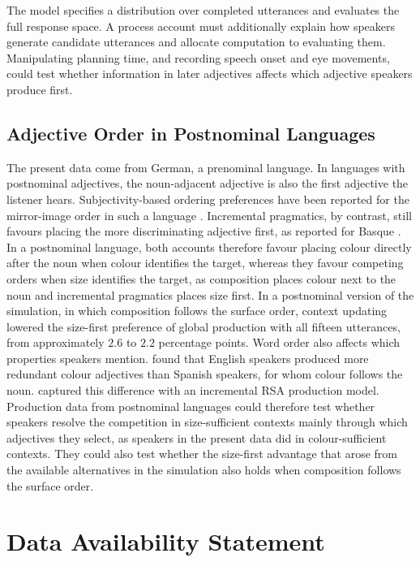 \documentclass[10pt,a4paper,fleqn]{article}
\begin{document}
The model specifies a distribution over completed utterances and evaluates the full response space.
A process account must additionally explain how speakers generate candidate utterances and allocate computation to evaluating them.
Manipulating planning time, and recording speech onset and eye movements, could test whether information in later adjectives affects which adjective speakers produce first.

\subsection{Adjective Order in Postnominal Languages}

The present data come from German, a prenominal language.
In languages with postnominal adjectives, the noun-adjacent adjective is also the first adjective the listener hears.
Subjectivity-based ordering preferences have been reported for the mirror-image order in such a language \citep{trainin2023subjectivity}.
Incremental pragmatics, by contrast, still favours placing the more discriminating adjective first, as reported for Basque \citep[p.~47]{fukumura2018ordering}.
In a postnominal language, both accounts therefore favour placing colour directly after the noun when colour identifies the target, whereas they favour competing orders when size identifies the target, as composition places colour next to the noun and incremental pragmatics places size first.
In a postnominal version of the simulation, in which composition follows the surface order, context updating lowered the size-first preference of global production with all fifteen utterances, from approximately $2.6$ to $2.2$ percentage points.
Word order also affects which properties speakers mention.
\citet{rubio2021wordorder} found that English speakers produced more redundant colour adjectives than Spanish speakers, for whom colour follows the noun.
\citet{waldon2021modeling} captured this difference with an incremental RSA production model.
Production data from postnominal languages could therefore test whether speakers resolve the competition in size-sufficient contexts mainly through which adjectives they select, as speakers in the present data did in colour-sufficient contexts.
They could also test whether the size-first advantage that arose from the available alternatives in the simulation also holds when composition follows the surface order.


\section{Data Availability Statement}
\end{document}
